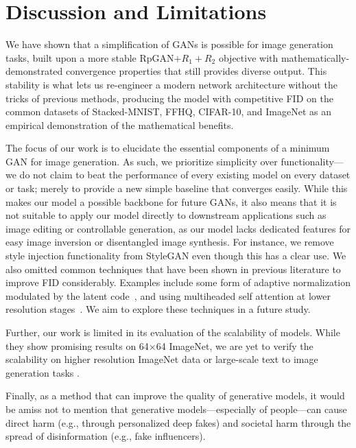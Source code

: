 \vspace{-0.2cm}
\section{Discussion and Limitations}
\vspace{-0.2cm}

We have shown that a simplification of GANs is possible for image generation tasks, built upon a more stable RpGAN$+ R_1 + R_2$ objective with mathematically-demonstrated convergence properties that still provides diverse output. This stability is what lets us re-engineer a modern network architecture without the tricks of previous methods, producing the \modelName model with competitive FID on the common datasets of Stacked-MNIST, FFHQ, CIFAR-10, and ImageNet as an empirical demonstration of the mathematical benefits.

The focus of our work is to elucidate the essential components of a minimum GAN for image generation. 
As such, we prioritize simplicity over functionality---we do not claim to beat the performance of every existing model on every dataset or task; merely to provide a new simple baseline that converges easily.
While this makes our model a possible backbone for future GANs, it also means that it is not suitable to apply our model directly to downstream applications such as image editing or controllable generation, as our model lacks dedicated features for easy image inversion or disentangled image synthesis. 
For instance, we remove style injection functionality from StyleGAN even though this has a clear use.
We also omitted common techniques that have been shown in previous literature to improve FID considerably. 
Examples include some form of adaptive normalization modulated by the latent code~\cite{adm,edm,sg1,zhang2022styleswin,dit,wang2023infodiffusion,sahoo2023diffusion}, and using multiheaded self attention at lower resolution stages~\cite{adm,edm,edm2}. 
We aim to explore these techniques in a future study. 

Further, our work is limited in its evaluation of the scalability of \modelName models. While they show promising results on 64$\times$64 ImageNet, we are yet to verify the scalability on higher resolution ImageNet data or large-scale text to image generation tasks \cite{gokaslan2024commoncanvas}.

Finally, as a method that can improve the quality of generative models, it would be amiss not to mention that generative models---especially of people---can cause direct harm (e.g., through personalized deep fakes) and societal harm through the spread of disinformation (e.g., fake influencers). 

